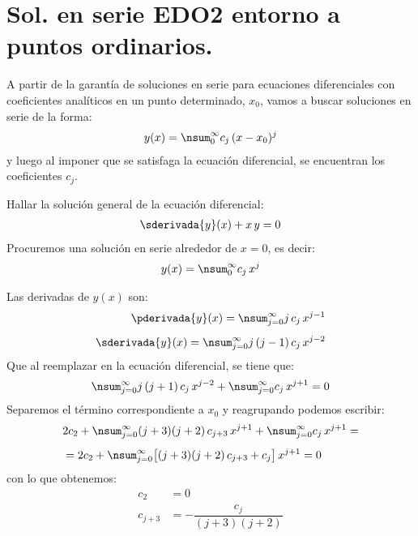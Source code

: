 \section{Sol. en serie EDO2 entorno a puntos ordinarios.}

A partir de la garantía de soluciones en serie para ecuaciones diferenciales con coeficientes analíticos en un punto determinado, $x_{0}$, vamos a buscar soluciones en serie de la forma:
\begin{align}
y (x) = \nsum_{0}^{\infty} c_{j} \, (x - x_{0})^{j}
\label{eq:ecuacion_07}    
\end{align}
y luego al imponer que se satisfaga la ecuación diferencial, se encuentran los coeficientes $c_{j}$.
\begin{ejemplo}
Hallar la solución general de la ecuación diferencial:
\begin{align*}
\sderivada{y} (x) + x \, y = 0
\end{align*}
Procuremos una solución en serie alrededor de $x = 0$, es decir:
\begin{align*}
y (x) = \nsum_{0}^{\infty} c_{j} \, x^{j}
\end{align*}

Las derivadas de $y (x)$ son:
\begin{align*}
\pderivada{y} (x) = \nsum_{j=0}^{\infty} j \, c_{j} \, x^{j-1} \\[0.5em]
\sderivada{y} (x) = \nsum_{j=0}^{\infty} j \, (j - 1) \, c_{j} \, x^{j-2}
\end{align*}
Que al reemplazar en la ecuación diferencial, se tiene que:
\begin{align*}
\nsum_{j=0}^{\infty} j \, (j + 1) \, c_{j} \, x^{j-2} + \nsum_{j=0}^{\infty} c_{j} \, x^{j+1} = 0
\end{align*}
Separemos el término correspondiente a $x_{0}$ y reagrupando podemos escribir:
\begin{align*}
&2 c_{2} + \nsum_{j=0}^{\infty} (j + 3)(j + 2) \, c_{j+3} \, x^{j+1} + \nsum_{j=0}^{\infty} c_{j} \, x^{j+1} = \\[0.5em]
&= 2 c_{2} + \nsum_{j=0}^{\infty} \big[ (j + 3)(j + 2) \, c_{j+3} + c_{j} \big] \, x^{j+1} = 0
\end{align*}
con lo que obtenemos:
\begin{align*}
c_{2} &= 0 \\[0.5em]
c_{j+3} &= - \dfrac{c_{j}}{(j + 3)(j + 2)}
\end{align*}


\end{ejemplo}
